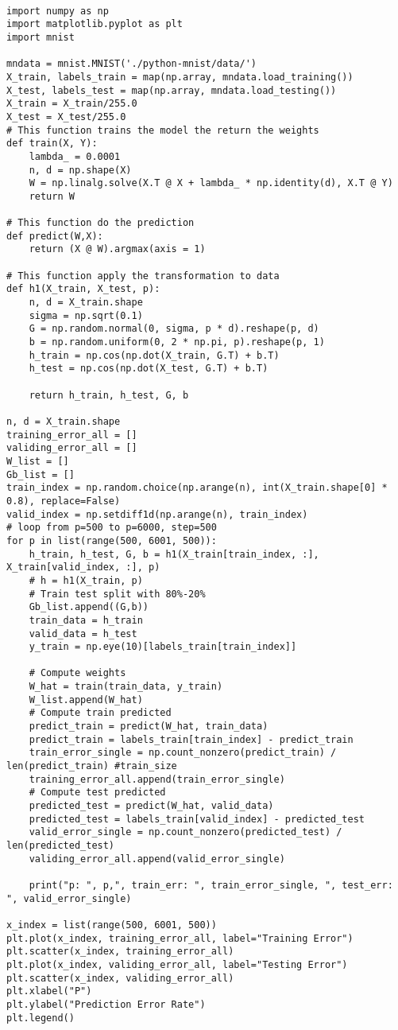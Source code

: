 \documentclass{article}
\begin{document}
\begin{verbatim}

import numpy as np
import matplotlib.pyplot as plt
import mnist

mndata = mnist.MNIST('./python-mnist/data/')
X_train, labels_train = map(np.array, mndata.load_training())
X_test, labels_test = map(np.array, mndata.load_testing())
X_train = X_train/255.0
X_test = X_test/255.0
# This function trains the model the return the weights
def train(X, Y):
	lambda_ = 0.0001
	n, d = np.shape(X)
	W = np.linalg.solve(X.T @ X + lambda_ * np.identity(d), X.T @ Y)
	return W

# This function do the prediction
def predict(W,X):
	return (X @ W).argmax(axis = 1)

# This function apply the transformation to data
def h1(X_train, X_test, p):
	n, d = X_train.shape
	sigma = np.sqrt(0.1)
	G = np.random.normal(0, sigma, p * d).reshape(p, d)
	b = np.random.uniform(0, 2 * np.pi, p).reshape(p, 1)
	h_train = np.cos(np.dot(X_train, G.T) + b.T)
	h_test = np.cos(np.dot(X_test, G.T) + b.T)
	
	return h_train, h_test, G, b

n, d = X_train.shape
training_error_all = []
validing_error_all = []
W_list = []
Gb_list = []
train_index = np.random.choice(np.arange(n), int(X_train.shape[0] * 0.8), replace=False)
valid_index = np.setdiff1d(np.arange(n), train_index)
# loop from p=500 to p=6000, step=500
for p in list(range(500, 6001, 500)):
	h_train, h_test, G, b = h1(X_train[train_index, :], X_train[valid_index, :], p)
	# h = h1(X_train, p)
	# Train test split with 80%-20%    
	Gb_list.append((G,b))
	train_data = h_train
	valid_data = h_test
	y_train = np.eye(10)[labels_train[train_index]]
	
	# Compute weights
	W_hat = train(train_data, y_train)
	W_list.append(W_hat)
	# Compute train predicted
	predict_train = predict(W_hat, train_data)
	predict_train = labels_train[train_index] - predict_train
	train_error_single = np.count_nonzero(predict_train) / len(predict_train) #train_size
	training_error_all.append(train_error_single)
	# Compute test predicted
	predicted_test = predict(W_hat, valid_data)
	predicted_test = labels_train[valid_index] - predicted_test
	valid_error_single = np.count_nonzero(predicted_test) / len(predicted_test)
	validing_error_all.append(valid_error_single)
	
	print("p: ", p,", train_err: ", train_error_single, ", test_err: ", valid_error_single)

x_index = list(range(500, 6001, 500))
plt.plot(x_index, training_error_all, label="Training Error")
plt.scatter(x_index, training_error_all)
plt.plot(x_index, validing_error_all, label="Testing Error")
plt.scatter(x_index, validing_error_all)
plt.xlabel("P")
plt.ylabel("Prediction Error Rate")
plt.legend()
\end{verbatim}
\end{document}
